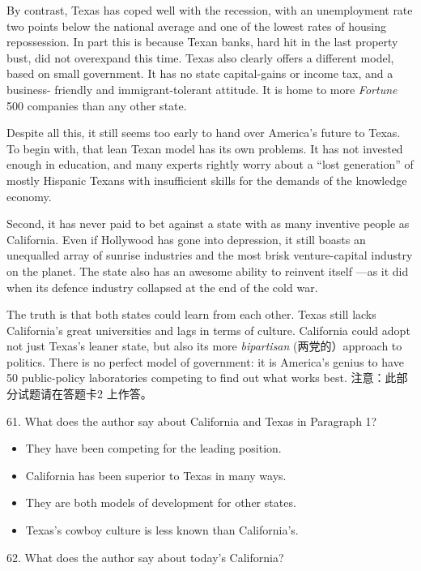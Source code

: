 \documentclass[UTF8,11pt]{ctexart}
\begin{document}
By contrast, Texas has coped well with the recession, with an unemployment rate two points below the national average and one of the lowest rates of housing repossession. In part this is because Texan banks, hard hit in the last property bust, did not overexpand this time. Texas also clearly offers a different model, based on small government. It has no state capital-gains or income tax, and a business- friendly and immigrant-tolerant attitude. It is home to more\textit{ Fortune} 500 companies than any other state.


Despite all this, it still seems too early to hand over America’s future to Texas. To begin with, that lean Texan model has its own problems. It has not invested enough in education, and many experts rightly worry about a “lost generation” of mostly Hispanic Texans with insufficient skills for the demands of the knowledge economy.


Second, it has never paid to bet against a state with as many inventive people as California. Even if Hollywood has gone into depression, it still boasts an unequalled array of sunrise industries and the most brisk venture-capital industry on the planet. The state also has an awesome ability to reinvent itself —as it did when its defence industry collapsed at the end of the cold war.


The truth is that both states could learn from each other. Texas still lacks California’s great universities and lags in terms of culture. California could adopt not just Texas’s leaner state, but also its more\textit{ bipartisan} (两党的）approach to politics. There is no perfect model of government: it is America’s genius to have 50 public-policy laboratories competing to find out what works best. 注意：此部分试题请在答题卡2 上作答。


61. What does the author say about California and Texas in Paragraph 1?


\begin{itemize}[leftmargin=2em,itemsep=.2em,topsep=.4em]\item[A.] They have been competing for the leading position.
\item[B.] California has been superior to Texas in many ways.
\item[C.] They are both models of development for other states.
\item[D.] Texas’s cowboy culture is less known than California’s.
\end{itemize}

62. What does the author say about today’s California?
\end{document}
